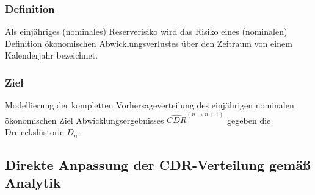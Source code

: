 \documentclass[12pt]{report}
\theoremstyle{dotless}
\theoremstyle{definition}
\begin{document}
\subsubsection{Definition}
Als einjähriges (nominales) Reserverisiko wird das Risiko eines (nominalen)
Definition ökonomischen Abwicklungsverlustes über den Zeitraum von einem Kalenderjahr bezeichnet.

\subsubsection{Ziel}
Modellierung der kompletten Vorhersageverteilung des einjährigen nominalen ökonomischen Ziel Abwicklungsergebnisses $\hat{CDR}^{(n\rightarrow n+1)}$ gegeben die Dreieckshistorie $D_n$.

\subsection{Direkte Anpassung der CDR-Verteilung gemäß Analytik}
\end{document}
